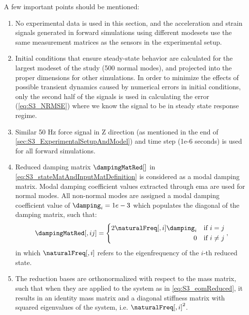 A few important points should be mentioned:
\begin{enumerate}
    \item No experimental data is used in this section, and the acceleration and strain signals generated in forward simulations using different modesets use the same measurement matrices as the sensors in the experimental setup.
    \item Initial conditions that ensure steady-state behavior are calculated for the largest modeset of the study (500 normal modes), and projected into the proper dimensions for other simulations. In order to minimize the effects of possible transient dynamics caused by numerical errors in initial conditions, only the second half of the signals is used in calculating the error (\cref{eq:S3_NRMSE}) where we know the signal to be in steady state response regime.
    \item Similar 50 Hz force signal in Z direction (as mentioned in the end of \cref{sec:S3_ExperimentalSetupAndModel}) and time step (1e-6 seconds) is used for all forward simulations. 
    \item Reduced damping matrix \(\dampingMatRed[]\) in \cref{eq:S3_stateMatAndInputMatDefinition} is considered as a modal damping matrix. Modal damping coefficient values extracted through \gls{ema} are used for normal modes. All non-normal modes are assigned a modal damping coefficient value of \(\damping_{i} = 1e-3\) which populates the diagonal of the damping matrix, such that:
          \begin{equation}
              \dampingMatRed[,ij]  =
              \left\{
              \begin{aligned}
                  2 \naturalFreq[,i] \damping_{i} & \quad \text{if } i = j    \\
                  0                               & \quad \text{if } i \neq j
              \end{aligned}
              \right. ,
          \end{equation}
          in which \(\naturalFreq[,i]\) refers to the eigenfrequency of the \(i\)-th reduced state.
    \item The reduction bases are orthonormalized with respect to the mass matrix, such that when they are applied to the system as in \cref{eq:S3_eomReduced}, it results in an identity mass matrix and a diagonal stiffness matrix with squared eigenvalues of the system, i.e. \(\naturalFreq[,i]^2\).
\end{enumerate}

